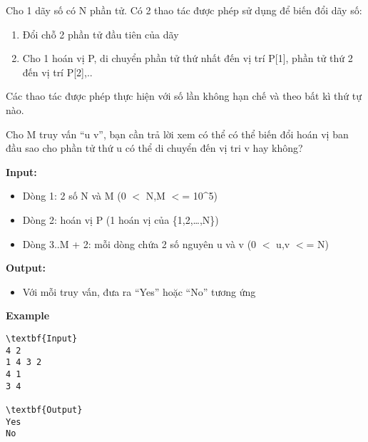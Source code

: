 

Cho 1 dãy số có N phần tử. Có 2 thao tác được phép sử dụng để biến đổi dãy số:
\begin{enumerate}
	\item 

Đổi chỗ 2 phần tử đầu tiên của dãy
	\item 

Cho 1 hoán vị P, di chuyển phần tử thứ nhất đến vị trí P[1], phần tử thứ 2 đến vị trí P[2],..
\end{enumerate}

Các thao tác được phép thực hiện với số lần không hạn chế và theo bất kì thứ tự nào.

Cho M truy vấn “u v”, bạn cần trả lời xem có thể có thể biến đổi hoán vị ban đầu sao cho phần tử thứ u có thể di chuyển đến vị tri v hay không?

\textbf{Input:}
\begin{itemize}
	\item 

Dòng 1: 2 số N và M (0 $<$ N,M $<$= 10\textasciicircum5)
	\item 

Dòng 2: hoán vị P (1 hoán vị của \{1,2,…,N\})
	\item 

Dòng 3..M + 2: mỗi dòng chứa 2 số nguyên u và v (0 $<$ u,v $<$= N)
\end{itemize}

\textbf{Output:}
\begin{itemize}
	\item 

Với mỗi truy vấn, đưa ra “Yes” hoặc “No” tương ứng
\end{itemize}

\textbf{Example}
\begin{verbatim}
\textbf{Input}
4 2
1 4 3 2
4 1
3 4

\textbf{Output}
Yes
No\end{verbatim}

 

 